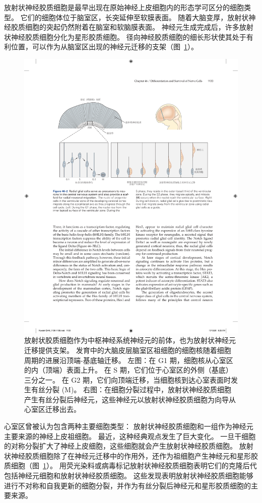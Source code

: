 放射状神经胶质细胞是最早出现在原始神经上皮细胞内的形态学可区分的细胞类型。
它们的细胞体位于脑室区，长突延伸至软膜表面。
随着大脑变厚，放射状神经胶质细胞的突起仍然附着在脑室和软脑膜表面。
神经元生成完成后，许多放射状神经胶质细胞分化为星形胶质细胞。
径向神经胶质细胞的细长形状使其处于有利位置，可以作为从脑室区出现的神经元迁移的支架（图~\ref{fig:46_2}）。


\begin{figure}[htbp]
	\centering
	\includegraphics[width=0.9\linewidth]{chap46/fig_46_2}
	\caption{放射状胶质细胞作为中枢神经系统神经元的前体，也为放射状神经元迁移提供支架。
		发育中的大脑皮层脑室区祖细胞的细胞核随着细胞周期的进展沿顶端-基底轴迁移。
		左图：在 G1 期，细胞核从心室区的内（顶端）表面上升。
		在 S 期，它们位于心室区的外侧（基底）三分之一。
		在 G2 期，它们向顶端迁移，当细胞核到达心室表面时发生有丝分裂 (M)。
		右图：在细胞分裂过程中，放射状神经胶质细胞产生有丝分裂后神经元，这些神经元以放射状神经胶质细胞为向导从心室区迁移出去。}
	\label{fig:46_2}
\end{figure}


心室区曾被认为包含两种主要细胞类型：
放射状神经胶质细胞和一组作为神经元主要来源的神经上皮祖细胞。
最近，这种经典观点发生了巨大变化。
一旦干细胞的对称分裂扩大了神经上皮细胞，这些细胞就会产生放射状神经胶质细胞。
放射状神经胶质细胞除了在神经元迁移中的作用外，还作为祖细胞产生神经元和星形胶质细胞（图~\ref{fig:46_2}）。
用荧光染料或病毒标记放射状神经胶质细胞表明它们的克隆后代包括神经元细胞和放射状神经胶质细胞。
这些发现表明放射状神经胶质细胞能够进行不对称和自我更新的细胞分裂，并作为有丝分裂后神经元和星形胶质细胞的主要来源。



